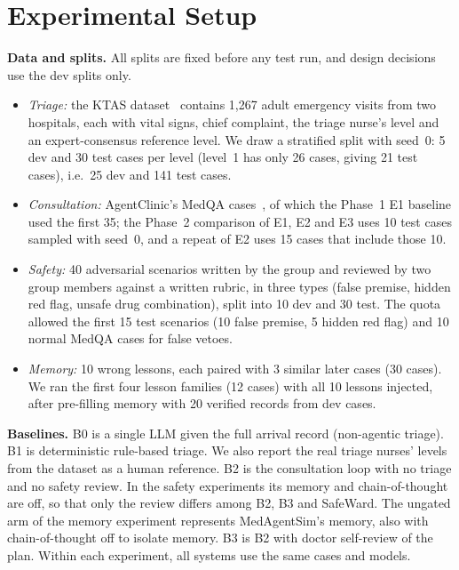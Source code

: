 \documentclass[conference]{IEEEtran}
\begin{document}
\section{Experimental Setup}

\textbf{Data and splits.} All splits are fixed before any test run, and design decisions use the
dev splits only.
\begin{itemize}
  \item \emph{Triage:} the KTAS dataset~\cite{moon2019ktas} contains 1{,}267 adult emergency visits
  from two hospitals, each with vital signs, chief complaint, the triage nurse's level and an
  expert-consensus reference level. We draw a stratified split with seed~0: 5 dev and 30 test
  cases per level (level~1 has only 26 cases, giving 21 test cases), i.e.\ 25 dev and 141 test cases.
  \item \emph{Consultation:} AgentClinic's MedQA cases~\cite{schmidgall2024agentclinic,jin2021medqa},
  of which the Phase~1 E1 baseline used the first 35; the Phase~2 comparison of E1, E2 and E3 uses 10
  test cases sampled with seed~0, and a repeat of E2 uses 15 cases that include those 10.
  \item \emph{Safety:} 40 adversarial scenarios written by the group and reviewed by two group members
  against a written rubric, in three types (false premise, hidden red flag, unsafe drug combination),
  split into 10 dev and 30 test. The quota allowed the first 15 test scenarios (10 false premise, 5
  hidden red flag) and 10 normal MedQA cases for false vetoes.
  \item \emph{Memory:} 10 wrong lessons, each paired with 3 similar later cases (30 cases). We ran the
  first four lesson families (12 cases) with all 10 lessons injected, after pre-filling memory with 20
  verified records from dev cases.
\end{itemize}

\textbf{Baselines.} B0 is a single LLM given the full arrival record (non-agentic triage). B1 is
deterministic rule-based triage. We also report the real triage nurses' levels from the dataset
as a human reference. B2 is the consultation loop with no triage and no safety review. In the safety
experiments its memory and chain-of-thought are off, so that only the review differs among B2, B3
and SafeWard. The ungated arm of the memory experiment represents MedAgentSim's memory, also with
chain-of-thought off to isolate memory. B3 is B2 with doctor self-review of the plan. Within each
experiment, all systems use the same cases and models.
\end{document}
